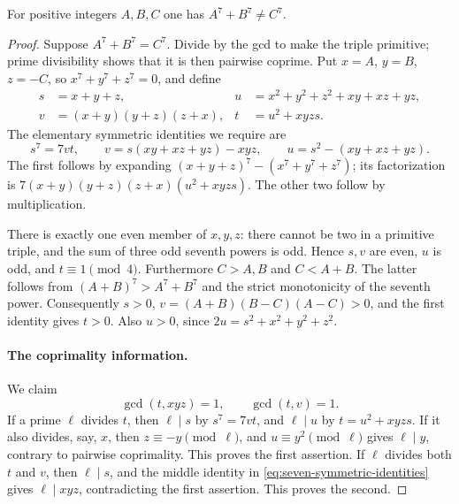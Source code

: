 \begin{theorem}\label{thm:flt-seven}
For positive integers $A,B,C$ one has $A^7+B^7\ne C^7$.
\end{theorem}

\begin{proof}
Suppose $A^7+B^7=C^7$.  Divide by the gcd to make the triple primitive;
prime divisibility shows that it is then pairwise coprime.  Put
$x=A$, $y=B$, $z=-C$, so $x^7+y^7+z^7=0$, and define
\begin{align*}
 s&=x+y+z, &
 u&=x^2+y^2+z^2+xy+xz+yz,\\
 v&=(x+y)(y+z)(z+x), &
 t&=u^2+xyzs.
\end{align*}
The elementary symmetric identities we require are
\begin{equation}\label{eq:seven-symmetric-identities}
 s^7=7vt,\qquad
 v=s(xy+xz+yz)-xyz,\qquad
 u=s^2-(xy+xz+yz).
\end{equation}
The first follows by expanding
$(x+y+z)^7-(x^7+y^7+z^7)$; its factorization is
$7(x+y)(y+z)(z+x)(u^2+xyzs)$.  The other two follow by multiplication.

There is exactly one even member of $x,y,z$: there cannot be two in a
primitive triple, and the sum of three odd seventh powers is odd.  Hence
$s,v$ are even, $u$ is odd, and $t\equiv1\pmod4$.
Furthermore $C>A,B$ and $C<A+B$.  The latter follows from
$(A+B)^7>A^7+B^7$ and the strict monotonicity of the seventh power.
Consequently $s>0$, $v=(A+B)(B-C)(A-C)>0$, and the first identity gives
$t>0$.  Also $u>0$, since
$2u=s^2+x^2+y^2+z^2$.

\paragraph{The coprimality information.}
We claim
\begin{equation}\label{eq:seven-coprimality}
 \gcd(t,xyz)=1,\qquad \gcd(t,v)=1.
\end{equation}
If a prime $\ell$ divides $t$, then $\ell\mid s$ by $s^7=7vt$, and
$\ell\mid u$ by $t=u^2+xyzs$.  If it also divides, say, $x$, then
$z\equiv-y\pmod\ell$, and $u\equiv y^2\pmod\ell$ gives $\ell\mid y$,
contrary to pairwise coprimality.  This proves the first assertion.  If
$\ell$ divides both $t$ and $v$, then $\ell\mid s$, and the middle identity
in \eqref{eq:seven-symmetric-identities} gives $\ell\mid xyz$, contradicting
the first assertion.  This proves the second.


\end{proof}

